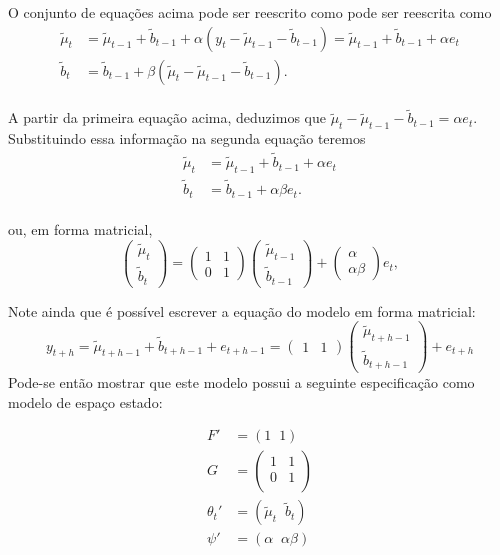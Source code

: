 \documentclass[
  letterpaper,
  DIV=11,
  numbers=noendperiod]{scrreprt}
\theoremstyle{definition}
\theoremstyle{plain}
\theoremstyle{definition}
\theoremstyle{plain}
\theoremstyle{remark}
\begin{document}
O conjunto de equações acima pode ser reescrito como pode ser reescrita
como \[\begin{align*}
    \tilde{\mu}_t &= \tilde{\mu}_{t-1} + \tilde{b}_{t-1}+\alpha\left( y_t-\tilde{\mu}_{t-1} - \tilde{b}_{t-1}\right)= \tilde{\mu}_{t-1} + \tilde{b}_{t-1}+\alpha e_t\\
    \tilde{b}_t &= \tilde{b}_{t-1}+\beta (\tilde{\mu}_t - \tilde{\mu}_{t-1}-\tilde{b}_{t-1}).
    \end{align*}\]\\
A partir da primeira equação acima, deduzimos que
\(\tilde{\mu}_t-\tilde{\mu}_{t-1}-\tilde{b}_{t-1}=\alpha e_t\).
Substituindo essa informação na segunda equação teremos \[\begin{align*}
    \tilde{\mu}_t &= \tilde{\mu}_{t-1} + \tilde{b}_{t-1}+\alpha e_t\\
    \tilde{b}_t &= \tilde{b}_{t-1}+\alpha\beta e_t.
    \end{align*}\]\\
ou, em forma matricial,
\[\left(\begin{array}{c}\tilde{\mu}_t\\ \tilde{b}_t\end{array}\right)=\left(\begin{array}{cc}1 & 1 \\ 0 & 1\end{array}\right)\left(\begin{array}{c}\tilde{\mu}_{t-1}\\ \tilde{b}_{t-1}\end{array}\right)+\left(\begin{array}{c}\alpha\\ \alpha\beta\end{array}\right)e_t,\]

Note ainda que é possível escrever a equação do modelo em forma
matricial:
\[y_{t+h}=\tilde{\mu}_{t+h-1}+\tilde{b}_{t+h-1}+e_{t+h-1}=(\begin{array}{cc}1&1\end{array})\left(\begin{array}{c}\tilde{\mu}_{t+h-1}\\ \tilde{b}_{t+h-1}\end{array}\right)+e_{t+h}\]
Pode-se então mostrar que este modelo possui a seguinte especificação
como modelo de espaço estado:

\[\begin{align}
F'&=(1\;\; 1)\\
G&=\left(\begin{array}{cc} 1 & 1 \\ 0 & 1\\ \end{array}\right)\\
\theta_t'&=(\tilde{\mu}_t\;\;\tilde{b}_t)\\
\psi'&=(\alpha\;\;\alpha\beta)
\end{align}\]
\end{document}
